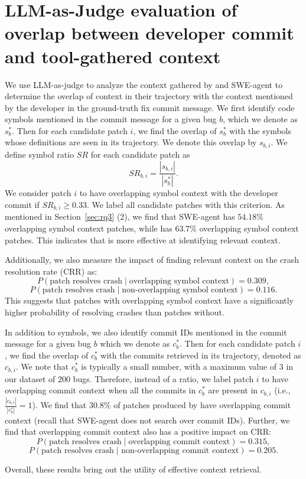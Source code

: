 \section{LLM-as-Judge evaluation of overlap between developer commit and tool-gathered context}
\label{app:llm-as-judge}
We use LLM-as-judge to analyze the context gathered by \cresearcher{} and SWE-agent to determine the overlap of context in their trajectory with the context mentioned by the developer in the ground-truth fix commit message. We first identify code symbols mentioned in the commit message for a given bug $b$, which we denote as $s^*_{b}$. Then for each candidate patch $i$, we find the overlap of $s^*_b$ with the symbols whose definitions are seen in its trajectory. We denote this overlap by $s_{b, i}$. We define symbol ratio $SR$ for each candidate patch as $$SR_{b,i} = \frac{ |s_{b,i}|}{|s^*_{b}|} .$$
We consider patch $i$ to have overlapping symbol context with the developer commit if $SR_{b,i} \ge 0.33$. We label all candidate patches with this criterion. As mentioned in Section~\ref{sec:rq3} (2), we find that SWE-agent has $54.18\%$ overlapping symbol context patches, while \cresearcher{} has $63.7\%$ overlapping symbol context patches. This indicates that \cresearcher{} is more effective at identifying relevant context. 

Additionally, we also measure the impact of finding relevant context on the crash resolution rate (CRR) as:
$$P(\text{patch resolves crash} \;|\; \text{overlapping symbol context}) = 0.309, $$
$$P(\text{patch resolves crash} \;|\; \text{non-overlapping symbol context}) = 0.116.$$
This suggests that patches with overlapping symbol context have a significantly higher probability of resolving crashes than patches without. 

In addition to symbols, we also identify commit IDs mentioned in the commit message for a given bug $b$ which we denote as $c^*_b$. Then for each candidate patch $i$, we find the overlap of $c^*_b$ with the commits retrieved in its trajectory, denoted as $c_{b,i}$.
We note that $c^*_b$ is typically a small number, with a maximum value of $3$ in our dataset of $200$ bugs.
Therefore, instead of a ratio, we label patch $i$ to have overlapping commit context when all the commits in $c^*_b$ are present in $c_{b,i}$ (i.e., $\frac{|c_{b,i}|}{|c^*_b|} = 1$).
We find that $30.8\%$ of patches produced by \cresearcher{} have overlapping commit context (recall that SWE-agent does not search over commit IDs). Further, we find that overlapping commit context also has a positive impact on CRR: $$P(\text{patch resolves crash} \;|\; \text{overlapping commit context}) = 0.315,$$ $$P(\text{patch resolves crash} \;|  \text{ non-overlapping commit context}) = 0.205.$$

Overall, these results bring out the utility of effective context retrieval.